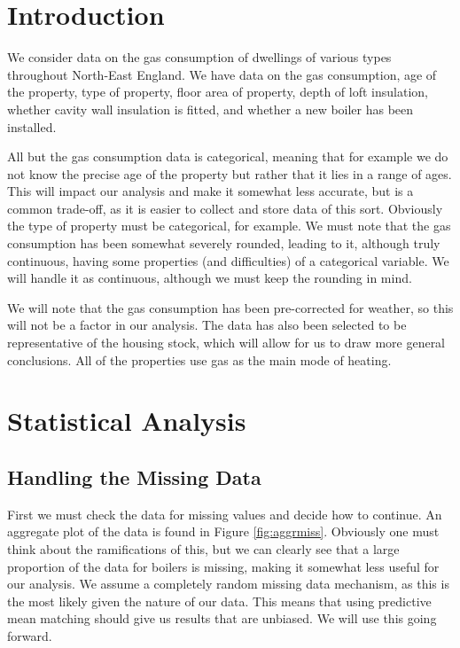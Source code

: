 \documentclass[9pt]{extarticle}
\begin{document}
\section{Introduction}

We consider data on the gas consumption of dwellings of various types throughout North-East England. We have data on the gas consumption, age of the property, type of property, floor area of property, depth of loft insulation, whether cavity wall insulation is fitted, and whether a new boiler has been installed.

All but the gas consumption data is categorical, meaning that for example we do not know the precise age of the property but rather that it lies in a range of ages. This will impact our analysis and make it somewhat less accurate, but is a common trade-off, as it is easier to collect and store data of this sort. Obviously the type of property must be categorical, for example. We must note that the gas consumption has been somewhat severely rounded, leading to it, although truly continuous, having some properties (and difficulties) of a categorical variable. We will handle it as continuous, although we must keep the rounding in mind.

We will note that the gas consumption has been pre-corrected for weather, so this will not be a factor in our analysis. The data has also been selected to be representative of the housing stock, which will allow for us to draw more general conclusions. All of the properties use gas as the main mode of heating. 

\section{Statistical Analysis}

\subsection{Handling the Missing Data}

First we must check the data for missing values and decide how to continue. An aggregate plot of the data is found in Figure \ref{fig:aggrmiss}. Obviously one must think about the ramifications of this, but we can clearly see that a large proportion of the data for boilers is missing, making it somewhat less useful for our analysis. We assume a completely random missing data mechanism, as this is the most likely given the nature of our data. This means that using predictive mean matching should give us results that are unbiased. We will use this going forward.
\end{document}
